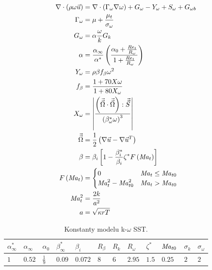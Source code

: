         \begin{align} \label{eq:rovnice-pro-omega}
            \nabla \cdot \left( \rho \omega \Vec{u} \right) &= \nabla \cdot \left( \Gamma _\omega \nabla \omega \right) + G _\omega - Y _\omega + S _\omega + G _{\omega b} \\
            \Gamma _\omega &= \mu + \frac{\mu _t}{\sigma _\omega} \\
            G _\omega &= \alpha \frac{\omega}{k} G _k \\
            \alpha &= \frac{\alpha _\infty}{\alpha ^*}\left( \frac{\alpha _0 + \frac{Re_t}{R_\omega}}{1 + \frac{Re_t}{R_\omega}} \right) \\
            Y _\omega &= \rho \beta f_\beta \omega ^2 \\
            f _\beta &= \frac{1 + 70 X \omega}{1 + 80 X _\omega} \\
            X _\omega &= \left| \frac{\left( \Vec{\Vec{\Omega}} \cdot \Vec{\Vec{\Omega}} \right) : \Vec{\Vec{S}}}{\left( \beta _\omega ^* \omega \right)^3} \right| \\
            \Vec{\Vec{\Omega}} &= \frac{1}{2} \left( \nabla \Vec{u} - \nabla \Vec{u}^T \right) \\
            \beta &= \beta _i \left[ 1 - \frac{\beta _i ^*}{\beta _i} \zeta ^* F\left( \mathord{\mathit{Ma}}_t \right) \right] \\
            F \left( \mathord{\mathit{Ma}}_t \right) &= \begin{cases}
                0   &   \mathord{\mathit{Ma}}_t \leq \mathord{\mathit{Ma}}_{t0} \\
                \mathord{\mathit{Ma}}_t ^2 - \mathord{\mathit{Ma}} _{t0} ^2 & \mathord{\mathit{Ma}}_t > \mathord{\mathit{Ma}} _{t0} \\
            \end{cases} \\
            \mathord{\mathit{Ma}} _t ^2 &= \frac{2k}{a^2} \\
             a &= \sqrt{\kappa r T}
        \end{align}

        \begin{table}[ht!]
            \centering
            \begin{tabular}{l|l|l|l|l|l|l|l|l|l|l|l}
            $\alpha _\infty ^*$ & $\alpha _\infty$ & $\alpha _0$  & $\beta _\infty ^*$ & $\beta _i$ & $R_\beta $ & $R_k$ & $R_\omega$ & $\zeta ^*$ & $\mathord{\mathit{Ma}} _{t0}$ & $\sigma _k$ & $\sigma _\omega$ \\ \hline
            $1$                 & $0.52$           & $\frac{1}{9} $& $0.09$             & $0.072$    & $8$        & $6$   & $2.95$     & $1.5$      & $0.25$      & $2$         & $2$             
            \end{tabular}
            \caption{Konstanty modelu k-$\omega$ SST.}
            \label{tab:konstanty-turbulence}
            \end{table}
    \newpage
